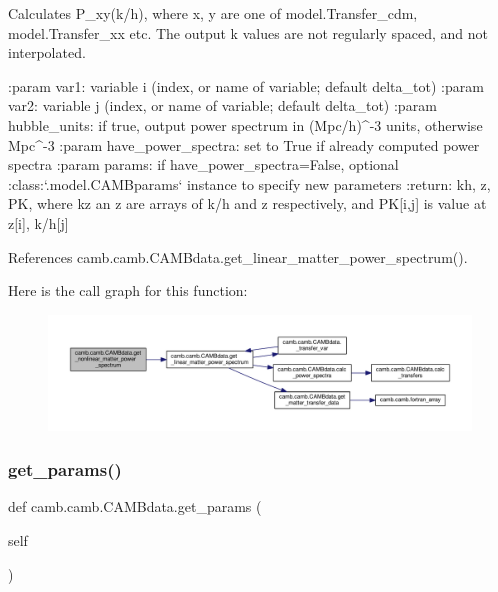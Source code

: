 \begin{DoxyVerb}Calculates P_{xy}(k/h), where x, y are one of model.Transfer_cdm, model.Transfer_xx etc.
The output k values are not regularly spaced, and not interpolated.

:param var1: variable i (index, or name of variable; default delta_tot)
:param var2: variable j (index, or name of variable; default delta_tot)
:param hubble_units: if true, output power spectrum in (Mpc/h)^{-3} units, otherwise Mpc^{-3}
:param have_power_spectra: set to True if already computed power spectra
:param params: if have_power_spectra=False, optional :class:`.model.CAMBparams` instance to specify new parameters
:return: kh, z, PK, where kz an z are arrays of k/h and z respectively, and PK[i,j] is value at z[i], k/h[j]
\end{DoxyVerb}
 

References camb.\+camb.\+C\+A\+M\+Bdata.\+get\+\_\+linear\+\_\+matter\+\_\+power\+\_\+spectrum().

Here is the call graph for this function\+:
\nopagebreak
\begin{figure}[H]
\begin{center}
\leavevmode
\includegraphics[width=350pt]{classcamb_1_1camb_1_1CAMBdata_a360e97e0d8883903266ec0781188120c_cgraph}
\end{center}
\end{figure}
\mbox{\label{classcamb_1_1camb_1_1CAMBdata_a47917b8227d3cacc5e0d28cac7810f95}} 
\subsubsection{\texorpdfstring{get\+\_\+params()}{get\_params()}}
{\footnotesize\ttfamily def camb.\+camb.\+C\+A\+M\+Bdata.\+get\+\_\+params (\begin{DoxyParamCaption}\item[{}]{self }\end{DoxyParamCaption})}

